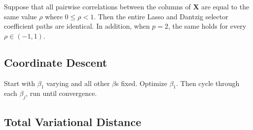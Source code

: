 \begin{theorem}
Suppose that all pairwise correlations between the columns of \(\boldsymbol{X}\) are equal to the same value \(\rho\) where \(0 \leq \rho < 1\). Then the entire Lasso and Dantzig selector coefficient paths are identical. In addition, when \(p=2\), the same holds for every \(\rho \in (-1, 1)\).

\end{theorem}

\subsection{Coordinate Descent}

Start with \(\beta_1\) varying and all other \(\beta\)s fixed. Optimize \(\beta_1\). Then cycle through each \(\beta_j\), run until convergence.




\subsection{Total Variational Distance}



%
%
%
%
%
%
%
%
%
%
%
%
%



